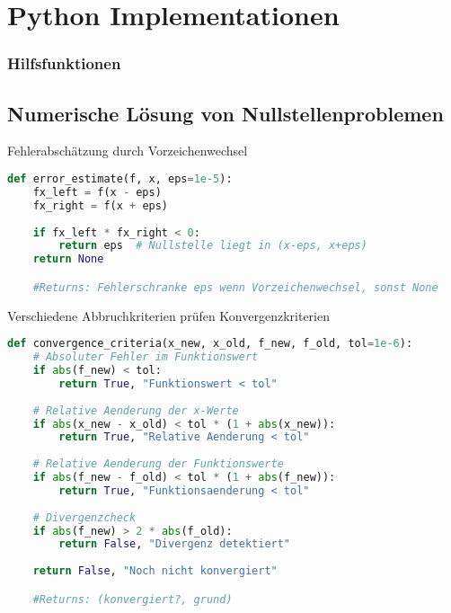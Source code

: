 
\section{Python Implementationen}

\subsubsection{Hilfsfunktionen}

\subsection{Numerische Lösung von Nullstellenproblemen}

\begin{examplecode}{Fehlerabschätzung durch Vorzeichenwechsel}
\begin{lstlisting}[language=Python, style=basesmol]
def error_estimate(f, x, eps=1e-5):
    fx_left = f(x - eps)
    fx_right = f(x + eps)
    
    if fx_left * fx_right < 0:
        return eps  # Nullstelle liegt in (x-eps, x+eps)
    return None

    #Returns: Fehlerschranke eps wenn Vorzeichenwechsel, sonst None
\end{lstlisting}
\end{examplecode}

\begin{examplecode}{Verschiedene Abbruchkriterien prüfen} Konvergenzkriterien
\begin{lstlisting}[language=Python, style=basesmol]
def convergence_criteria(x_new, x_old, f_new, f_old, tol=1e-6):
    # Absoluter Fehler im Funktionswert
    if abs(f_new) < tol:
        return True, "Funktionswert < tol"
        
    # Relative Aenderung der x-Werte
    if abs(x_new - x_old) < tol * (1 + abs(x_new)):
        return True, "Relative Aenderung < tol"
        
    # Relative Aenderung der Funktionswerte
    if abs(f_new - f_old) < tol * (1 + abs(f_new)):
        return True, "Funktionsaenderung < tol"
        
    # Divergenzcheck
    if abs(f_new) > 2 * abs(f_old):
        return False, "Divergenz detektiert"
        
    return False, "Noch nicht konvergiert"

    #Returns: (konvergiert?, grund)
\end{lstlisting}
\end{examplecode}


